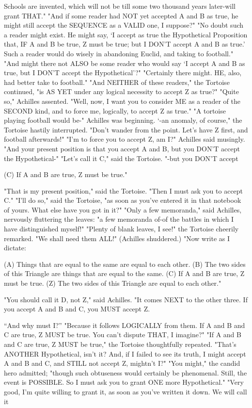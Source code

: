 Schools are invented, which will not be till some two thousand years later-will grant THAT." "And if some reader had NOT yet accepted A and B as true, he might still accept the SEQUENCE as a VALID one, I suppose?" "No doubt such a reader might exist. He might say, `I accept as true the Hypothetical Proposition that, IF A and B be true, Z must be true; but I DON'T accept A and B as true.' Such a reader would do wisely in abandoning Euclid, and taking to football." "And might there not ALSO be some reader who would say `I accept A and B as true, but I DON'T accept the Hypothetical'?" "Certainly there might. HE, also, had better take to football." "And NEITHER of these readers," the Tortoise continued, "is AS YET under any logical necessity to accept Z as true?" "Quite so," Achilles assented. "Well, now, I want you to consider ME as a reader of the SECOND kind, and to force me, logically, to accept Z as true." "A tortoise playing football would be-" Achilles was beginning. `-an anomaly, of course," the Tortoise hastily interrupted. "Don't wander from the point. Let's have Z first, and football afterwards!" "I'm to force you to accept Z, am I?" Achilles said musingly. "And your present position is that you accept A and B, but you DON'T accept the Hypothetical-" "Let's call it C," said the Tortoise. "-but you DON'T accept 

(C) If A and B are true, Z must be true." 

"That is my present position," said the Tortoise. "Then I must ask you to accept C." "I'll do so," said the Tortoise, "as soon as you've entered it in that notebook of yours. What else have you got in it?" "Only a few memoranda," said Achilles, nervously fluttering the leaves: "a few memoranda of-of the battles in which I have distinguished myself!" "Plenty of blank leaves, I see!" the Tortoise cheerily remarked. "We shall need them ALL!" (Achilles shuddered.) "Now write as I dictate: 

(A) Things that are equal to the same are equal to each other. (B) The two sides of this Triangle are things that are equal to the same. (C) If A and B are true, Z must be true. (Z) The two sides of this Triangle are equal to each other." 

"You should call it D, not Z," said Achilles. "It comes NEXT to the other three. If you accept A and B and C, you MUST accept Z. 







“And why must I?” "Because it follows LOGICALLY from them. If A and B and C are true, Z MUST be true. You can't dispute THAT, I imagine?" "If A and B and C are true, Z MUST be true," the Tortoise thoughtfully repeated. "That's ANOTHER Hypothetical, isn't it? And, if I failed to see its truth, I might accept A and B and C, and STILL not accept Z, mightn't I?" "You might," the candid hero admitted; "though such obtuseness would certainly be phenomenal. Still, the event is POSSIBLE. So I must ask you to grant ONE more Hypothetical." "Very good, I'm quite willing to grant it, as soon as you've written it down. We will call it 

